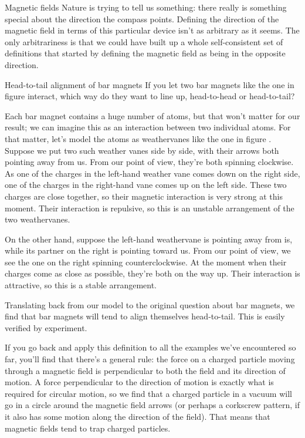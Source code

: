 \begin{envsubsection}{Magnetic fields}
Nature is trying to tell us something: there really is something special
about the direction the compass points. Defining the direction of the magnetic field in terms of this
particular device isn't as arbitrary as it seems. The only arbitrariness is that we could have
built up a whole self-consistent set of definitions that started by defining the magnetic field
as being in the opposite direction.

\begin{eg}{Head-to-tail alignment of bar magnets}\label{eg:headtotail}
\egquestion
If you let two bar magnets like the one in figure  interact, which way do
they want to line up, head-to-head or head-to-tail?

\eganswer
Each bar magnet contains a huge number of atoms, but that won't matter for our result; we can imagine
this as an interaction between two individual atoms. For that matter, let's model the atoms as weathervanes
like the one in figure . Suppose we put two such weather vanes side by side, with their
arrows both pointing away from us. From our point of view, they're both spinning clockwise. As one of the
charges in the left-hand weather vane comes down on the right side, one of the charges in the right-hand
vane comes up on the left side. These two charges are close together, so their magnetic interaction is
very strong at this moment. Their interaction is repulsive, so this is an unstable arrangement of the two
weathervanes.

On the other hand, suppose the left-hand weathervane is pointing away from is, while its partner on the
right is pointing toward us. From our point of view, we see the one on the right spinning counterclockwise.
At the moment when their charges come as close as possible, they're both on the way up. Their interaction
is attractive, so this is a stable arrangement.

Translating back from our model to the original question about bar magnets, we find that bar magnets
will tend to align themselves head-to-tail. This is easily verified by experiment.
\end{eg}



If you go back and apply this definition to all the examples we've encountered so far, you'll find
that there's a general rule: the force on a charged particle moving through a magnetic field is
perpendicular to both the field and its direction of motion. A force perpendicular to the direction
of motion is exactly what is required for circular motion, so we find that a charged particle in a
vacuum will go in a circle around the magnetic field arrows (or perhaps a corkscrew pattern, if it
also has some motion along the direction of the field). That means that magnetic fields tend to trap
charged particles.


\end{envsubsection}
